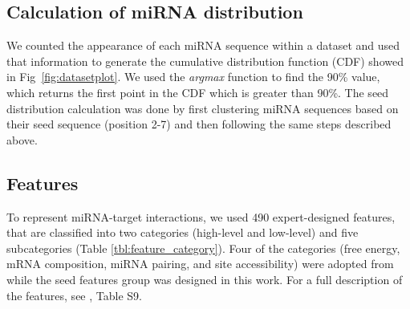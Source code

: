 \documentclass{bmcart}
\begin{document}
\subsection*{Calculation of miRNA distribution} \label{miRNAdistribution2}
We counted the appearance of each miRNA sequence within a dataset and used that information to generate the cumulative distribution function (CDF) showed in Fig~\ref{fig:datasetplot}. We used the \textit{argmax} function to find the 90\% value, which returns the first point in the CDF which is greater than 90\%. 
The seed distribution calculation was done by first clustering miRNA sequences based on their seed sequence (position 2-7) and then following the same steps described above.


\subsection*{Features} \label{methods_features}
To represent miRNA-target interactions, we used 490 expert-designed features, that are classified into two categories (high-level and low-level) and five subcategories (Table \ref{tbl:feature_category}). Four of the categories (free energy, mRNA composition, miRNA pairing, and site accessibility) were adopted from \cite{wen2018deepmirtar} while the seed features group was designed in this work. For a full description of the features, see ,  Table S9.
\end{document}
